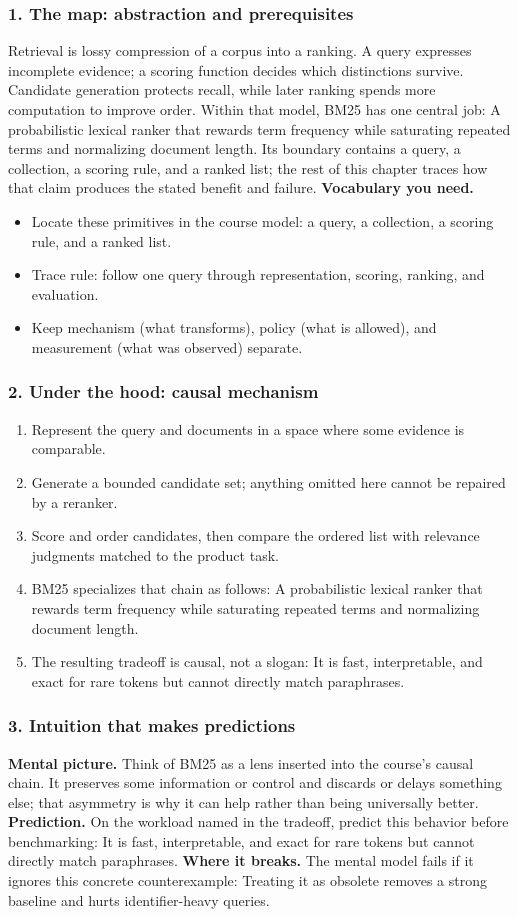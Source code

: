 \subsubsection*{1. The map: abstraction and prerequisites}
Retrieval is lossy compression of a corpus into a ranking. A query expresses incomplete evidence; a scoring function decides which distinctions survive. Candidate generation protects recall, while later ranking spends more computation to improve order.
Within that model, BM25 has one central job: A probabilistic lexical ranker that rewards term frequency while saturating repeated terms and normalizing document length. Its boundary contains a query, a collection, a scoring rule, and a ranked list; the rest of this chapter traces how that claim produces the stated benefit and failure.
\textbf{Vocabulary you need.}\begin{itemize}
\item Locate these primitives in the course model: a query, a collection, a scoring rule, and a ranked list.
\item Trace rule: follow one query through representation, scoring, ranking, and evaluation.
\item Keep mechanism (what transforms), policy (what is allowed), and measurement (what was observed) separate.
\end{itemize}
\subsubsection*{2. Under the hood: causal mechanism}\begin{enumerate}
\item Represent the query and documents in a space where some evidence is comparable.
\item Generate a bounded candidate set; anything omitted here cannot be repaired by a reranker.
\item Score and order candidates, then compare the ordered list with relevance judgments matched to the product task.
\item BM25 specializes that chain as follows: A probabilistic lexical ranker that rewards term frequency while saturating repeated terms and normalizing document length.
\item The resulting tradeoff is causal, not a slogan: It is fast, interpretable, and exact for rare tokens but cannot directly match paraphrases.
\end{enumerate}
\subsubsection*{3. Intuition that makes predictions}
\textbf{Mental picture.} Think of BM25 as a lens inserted into the course's causal chain. It preserves some information or control and discards or delays something else; that asymmetry is why it can help rather than being universally better.
\textbf{Prediction.} On the workload named in the tradeoff, predict this behavior before benchmarking: It is fast, interpretable, and exact for rare tokens but cannot directly match paraphrases.
\textbf{Where it breaks.} The mental model fails if it ignores this concrete counterexample: Treating it as obsolete removes a strong baseline and hurts identifier-heavy queries.
